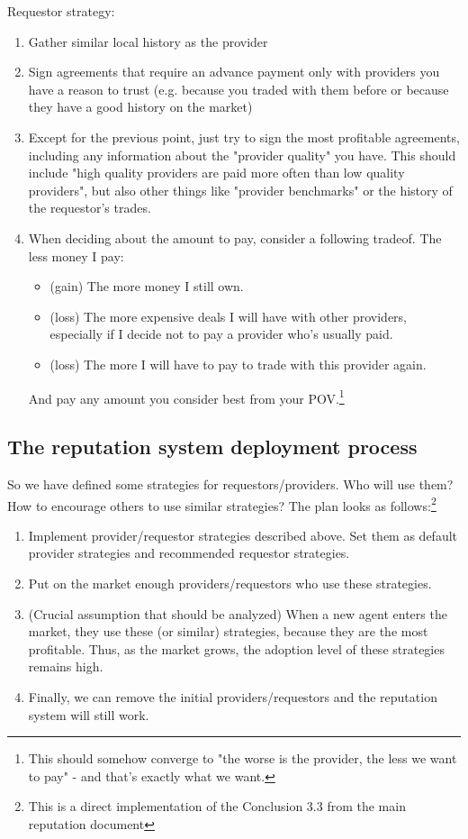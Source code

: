 \documentclass{article}
\begin{document}
Requestor strategy:
\begin{enumerate}
    \item Gather similar local history as the provider
    \item Sign agreements that require an advance payment only with providers you have a reason to trust 
        (e.g. because you traded with them before or because they have a good history on the market)
    \item Except for the previous point, just try to sign the most profitable agreements, including any information about the "provider quality" you have.
        This should include "high quality providers are paid more often than low quality providers", but also other things like "provider benchmarks" or
        the history of the requestor's trades.
    \item When deciding about the amount to pay, consider a following tradeof. The less money I pay:
        \begin{itemize}
            \item (gain) The more money I still own.
            \item (loss) The more expensive deals I will have with other providers, especially if I decide not to pay a provider who's usually paid.
            \item (loss) The more I will have to pay to trade with this provider again.
        \end{itemize}
        And pay any amount you consider best from your POV.\footnote{
            This should somehow converge to "the worse is the provider, the less we want to pay" - and that's exactly what we want.
        }
\end{enumerate}

\subsection{The reputation system deployment process}

So we have defined some strategies for requestors/providers.
Who will use them? How to encourage others to use similar strategies?
The plan looks as follows:\footnote{This is a direct implementation of the Conclusion 3.3 from the main reputation document}
\begin{enumerate}
    \item Implement provider/requestor strategies described above. Set them as default provider strategies and recommended requestor strategies.
    \item Put on the market enough providers/requestors who use these strategies.
    \item (Crucial assumption that should be analyzed) When a new agent enters the market, they use these (or similar) strategies, because they
        are the most profitable. Thus, as the market grows, the adoption level of these strategies remains high.
    \item Finally, we can remove the initial providers/requestors and the reputation system will still work.
\end{enumerate}
\end{document}
